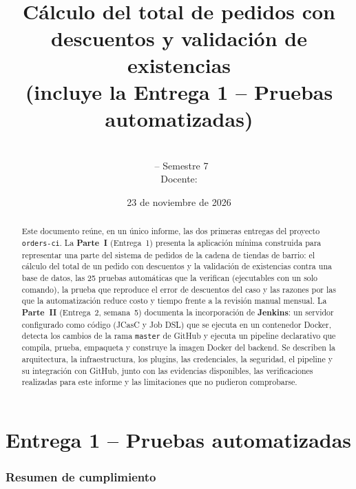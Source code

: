 \documentclass[11pt,a4paper]{article}
\title{\textbf{\entrega}\\[4pt]\large \entregasub\\[2pt]
\normalsize Cálculo del total de pedidos con descuentos y validación de existencias\\[2pt]
\small (incluye la Entrega 1 -- Pruebas automatizadas)}
\author{\integrantes\\[6pt]\small \curso\ -- Semestre 7\\ \small Docente: \docente}
\date{23 de noviembre de 2026}
\begin{document}
\maketitle

\begin{abstract}
Este documento reúne, en un único informe, las dos primeras entregas del proyecto \texttt{orders-ci}.
La \textbf{Parte~I} (Entrega~1) presenta la aplicación mínima construida para representar una parte
del sistema de pedidos de la cadena de tiendas de barrio: el cálculo del total de un pedido con
descuentos y la validación de existencias contra una base de datos, las 25 pruebas automáticas que
la verifican (ejecutables con un solo comando), la prueba que reproduce el error de descuentos del
caso y las razones por las que la automatización reduce costo y tiempo frente a la revisión manual
mensual. La \textbf{Parte~II} (Entrega~2, semana~5) documenta la incorporación de \textbf{Jenkins}:
un servidor configurado como código (JCasC y Job DSL) que se ejecuta en un contenedor Docker, detecta
los cambios de la rama \texttt{master} de GitHub y ejecuta un pipeline declarativo que compila, prueba,
empaqueta y construye la imagen Docker del backend. Se describen la arquitectura, la infraestructura,
los plugins, las credenciales, la seguridad, el pipeline y su integración con GitHub, junto con las
evidencias disponibles, las verificaciones realizadas para este informe y las limitaciones que no
pudieron comprobarse.
\end{abstract}

\setcounter{tocdepth}{1}
\tableofcontents
\newpage

\part{Entrega 1 -- Pruebas automatizadas}

\section{Resumen de cumplimiento}
\label{sec:resumen1}
\end{document}
